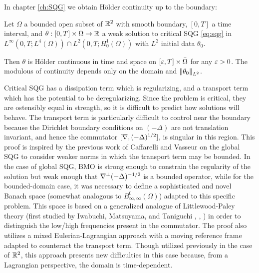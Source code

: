 In chapter \eqref{ch:SQG} we obtain H\"{o}lder continuity up to the boundary:
\begin{theorem}
Let $\Omega$ a bounded open subset of $\mathbb{R}^2$ with smooth boundary, $[0,T]$ a time interval, and $\theta:[0,T] \times \Omega \to \mathbb{R}$ a weak solution to critical SQG \eqref{eq:sqg} in $L^\infty(0,T; L^4(\Omega)) \cap L^2(0,T; H_0^1(\Omega))$ with $L^2$ initial data $\theta_0$.  

Then $\theta$ is H\"{o}lder continuous in time and space on $[\varepsilon,T]\times \bar{\Omega}$ for any $\varepsilon > 0$.  The modulous of continuity depends only on the domain and $\left\lVert\theta_0\right\rVert_{L^2}$.  
\end{theorem}
Critical SQG has a dissipation term which is regularizing, and a transport term which has the potential to be deregularizing.  Since the problem is critical, they are ostensibly equal in strength, so it is difficult to predict how solutions will behave.  The transport term is particularly difficult to control near the boundary because the Dirichlet boundary conditions on $(-\Delta)$ are not translation invariant, and hence the commutator $[\nabla, (-\Delta)^{1/2}]$, is singular in this region.  %
This proof is inspired by the previous work of Caffarelli and Vasseur \cite{CaVa} on the global SQG to consider weaker norms in which the transport term may be bounded.  In the case of global SQG, BMO is strong enough to constrain the regularity of the solution but weak enough that $\nabla^\perp(-\Delta)^{-1/2}$ is a bounded operator, 
while for the bounded-domain case, it was necessary to define a sophisticated and novel Banach space (somewhat analogous to $B_{\infty,\infty}^0(\Omega)$) adapted to this specific problem.  This space is based on a generalized analogue of Littlewood-Paley theory (first studied by Iwabuchi, Matsuyama, and Taniguchi \cite{IMT.besov}, \cite{IMT.bilinear}, \cite{IMT.schrodinger}) in order to distinguish the low/high frequencies present in the commutator.  
The proof also utilizes a mixed Eulerian-Lagrangian approach with a moving reference frame adapted to counteract the transport term.  Though utilized previously in the case of $\mathbb{R}^2$, this approach presents new difficulties in this case because, from a Lagrangian perspective, the domain is time-dependent.  

